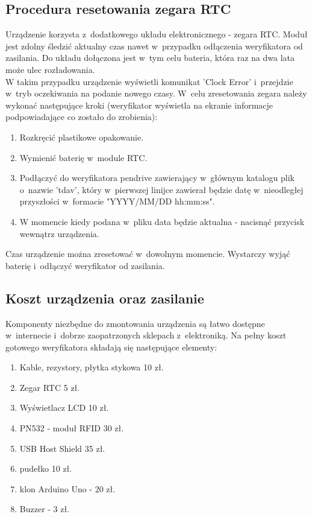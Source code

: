 \documentclass[declaration,shortabstract, mgr]{iithesis}
\begin{document}
\subsection{Procedura resetowania zegara RTC}
\indent Urządzenie korzysta z~dodatkowego układu elektronicznego - zegara RTC. Moduł jest zdolny śledzić aktualny czas nawet w~przypadku odłączenia weryfikatora od zasilania. Do układu dołączona jest w~tym celu bateria, która raz na dwa lata może ulec rozładowania.\\
\indent W takim przypadku urządzenie wyświetli komunikat 'Clock Error' i~przejdzie w~tryb oczekiwania na podanie nowego czasy. W~celu zresetowania zegara należy wykonać następujące kroki (weryfikator wyświetla na ekranie informacje podpowiadające co zostało do zrobienia):
\begin{enumerate}
\item Rozkręcić plastikowe opakowanie.
\item Wymienić baterię w~module RTC.
\item Podłączyć do weryfikatora pendrive zawierający w~głównym katalogu plik o~nazwie 'tdav', który w~pierwszej linijce zawierał będzie datę w~nieodległej przyszłości w~formacie "YYYY/MM/DD hh:mm:ss".
\item W momencie kiedy podana w~pliku data będzie aktualna - nacisnąć przycisk wewnątrz urządzenia.
\end{enumerate}
\indent Czas urządzenie można zresetować w~dowolnym momencie. Wystarczy wyjąć baterię i~odłączyć weryfikator od zasilania.
\subsection{Koszt urządzenia oraz zasilanie}
\indent Komponenty niezbędne do zmontowania urządzenia są łatwo dostępne w~internecie i~dobrze zaopatrzonych sklepach z~elektroniką. Na pełny koszt gotowego weryfikatora składają się następujące elementy:
\begin{enumerate}
\item Kable, rezystory, płytka stykowa 10 zł.
\item Zegar RTC 5 zł.
\item Wyświetlacz LCD 10 zł.
\item PN532 - moduł RFID 30 zł.
\item USB Host Shield 35 zł.
\item pudełko 10 zł.
\item klon Arduino Uno - 20 zł.
\item Buzzer - 3 zł.
\end{enumerate}
\end{document}
